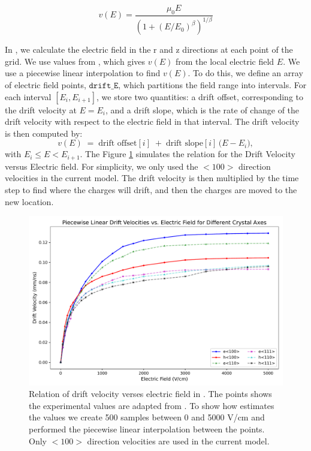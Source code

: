\begin{equation}
v(E) = \frac{\mu_0 E}{(1 + (E/E_0)^\beta)^{1/\beta}}
\end{equation}

In {\ehd}, we calculate the electric field in the r and z directions at each point of the grid. We use values from \cite{OMAR19871351}, which gives $v(E)$ from the local electric field $E$. We use a piecewise linear interpolation to find $v(E)$. To do this, we define an array of electric field points, $\texttt{drift\_E}$, which partitions the field range into intervals. For each interval $[E_i, E_{i+1}]$, we store two quantities: a drift offset, corresponding to the drift velocity at $E = E_i$, and a drift slope, which is the rate of change of the drift velocity with respect to the electric field in that interval. The drift velocity is then
computed by:
\[
v(E) \;=\; \text{drift offset}[i]
\;+\; \text{drift slope}[i] \,\bigl( E - E_i \bigr),
\]
with $E_i \le E < E_{i+1}$. The Figure \ref{ch3:fig:dv_vs_e} simulates the relation for the Drift Velocity versus Electric field.  For simplicity, we only used the $<100>$ direction velocities in the current model. The drift velocity is then multiplied by the time step to find where the charges will drift, and then the charges are moved to the new location.

\begin{figure}[!htb]
    \includegraphics[trim={0cm 0 0cm 0},clip,width=0.99\linewidth]{ch3/figs/ehd_dv_e.pdf}
    \caption{Relation of drift velocity verses electric field in {\ehd}. The points shows the experimental values are adapted from \cite{OMAR19871351}. To show how {\ehd} estimates the values we create 500 samples between 0 and 5000 V/cm and performed the piecewise linear interpolation between the points. Only $<100>$ direction velocities are used in the current model.}
    \label{ch3:fig:dv_vs_e}
\end{figure}

